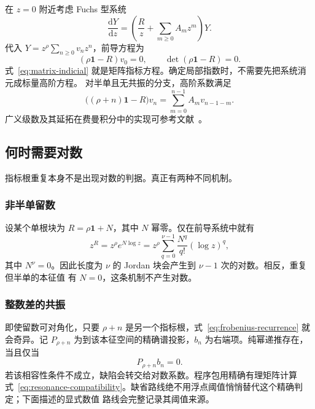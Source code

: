 \documentclass[11pt,a4paper]{ctexart}
\newcommand{\dd}{\mathrm d}
\newcommand{\Id}{\mathbf 1}
\renewcommand{\_}{\origunderscore\allowbreak}
\begin{document}
在 $z=0$ 附近考虑 Fuchs 型系统
\begin{equation}
  \frac{\dd Y}{\dd z}
  =\left(\frac{R}{z}+\sum_{m\geq0}A_m z^m\right)Y.
  \label{eq:fuchsian-system}
\end{equation}
代入 $Y=z^\rho\sum_{n\geq0}v_nz^n$，前导方程为
\begin{equation}
  (\rho\Id-R)v_0=0,
  \qquad
  \det(\rho\Id-R)=0.
  \label{eq:matrix-indicial}
\end{equation}
式~\eqref{eq:matrix-indicial} 就是矩阵指标方程。确定局部指数时，不需要先把系统消元成标量高阶方程。
对半单且无共振的分支，高阶系数满足
\begin{equation}
  \bigl((\rho+n)\Id-R\bigr)v_n
  =\sum_{m=0}^{n-1}A_m v_{n-1-m}.
  \label{eq:frobenius-recurrence}
\end{equation}
广义级数及其延拓在费曼积分中的实现可参考文献~\cite{Moriello:2019yhu}。

\subsection{何时需要对数}
\label{subsec:log}

指标根重复本身不是出现对数的判据。真正有两种不同机制。

\subsubsection{非半单留数}

设某个单根块为 $R=\rho\Id+N$，其中 $N$ 幂零。仅在前导系统中就有
\begin{equation}
  z^R=z^\rho e^{N\log z}
  =z^\rho\sum_{q=0}^{\nu-1}\frac{N^q}{q!}(\log z)^q,
  \label{eq:jordan-log}
\end{equation}
其中 $N^\nu=0$。因此长度为 $\nu$ 的 Jordan 块会产生到 $\nu-1$ 次的对数。相反，重复但半单的本征值
有 $N=0$，这条机制不产生对数。

\subsubsection{整数差的共振}

即使留数可对角化，只要 $\rho+n$ 是另一个指标根，式~\eqref{eq:frobenius-recurrence} 就会奇异。记
$P_{\rho+n}$ 为到该本征空间的精确谱投影，$b_n$ 为右端项。纯幂递推存在，当且仅当
\begin{equation}
  P_{\rho+n}b_n=0.
  \label{eq:resonance-compatibility}
\end{equation}
若该相容性条件不成立，缺陷会转交给对数系数。程序包用精确有理矩阵计算
式~\eqref{eq:resonance-compatibility}。缺省路线绝不用浮点阈值悄悄替代这个精确判定；下面描述的显式数值
路线会完整记录其阈值来源。
\end{document}

